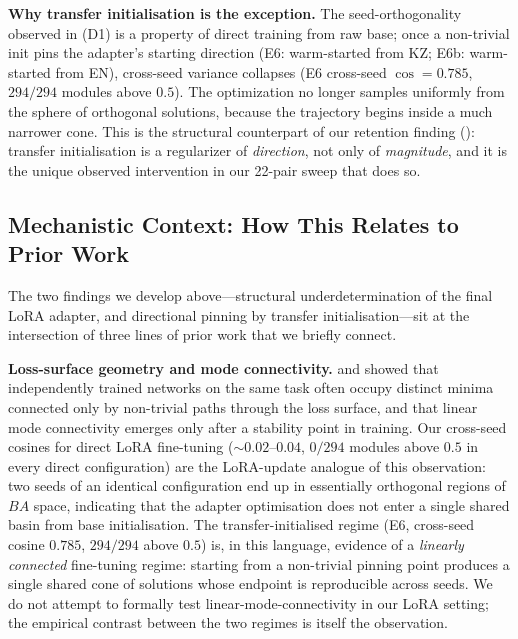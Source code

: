 \documentclass[11pt]{article}
\begin{document}
\textbf{Why transfer initialisation is the exception.} The seed-orthogonality observed in (D1) is a property of direct training from raw base; once a non-trivial init pins the adapter's starting direction (E6: warm-started from KZ; E6b: warm-started from EN), cross-seed variance collapses (E6 cross-seed $\cos = 0.785$, $294/294$ modules above $0.5$). The optimization no longer samples uniformly from the sphere of orthogonal solutions, because the trajectory begins inside a much narrower cone. This is the structural counterpart of our retention finding (): transfer initialisation is a regularizer of \emph{direction}, not only of \emph{magnitude}, and it is the unique observed intervention in our 22-pair sweep that does so.

\subsection{Mechanistic Context: How This Relates to Prior Work}
\label{sec:mechanistic}

The two findings we develop above---structural underdetermination of the final LoRA adapter, and directional pinning by transfer initialisation---sit at the intersection of three lines of prior work that we briefly connect.

\textbf{Loss-surface geometry and mode connectivity.} \citet{garipov2018loss} and \citet{frankle2020linear} showed that independently trained networks on the same task often occupy distinct minima connected only by non-trivial paths through the loss surface, and that linear mode connectivity emerges only after a stability point in training. Our cross-seed cosines for direct LoRA fine-tuning ($\sim 0.02$--$0.04$, $0/294$ modules above $0.5$ in every direct configuration) are the LoRA-update analogue of this observation: two seeds of an identical configuration end up in essentially orthogonal regions of $BA$ space, indicating that the adapter optimisation does not enter a single shared basin from base initialisation. The transfer-initialised regime (E6, cross-seed cosine $0.785$, $294/294$ above $0.5$) is, in this language, evidence of a \emph{linearly connected} fine-tuning regime: starting from a non-trivial pinning point produces a single shared cone of solutions whose endpoint is reproducible across seeds. We do not attempt to formally test linear-mode-connectivity in our LoRA setting; the empirical contrast between the two regimes is itself the observation.
\end{document}
